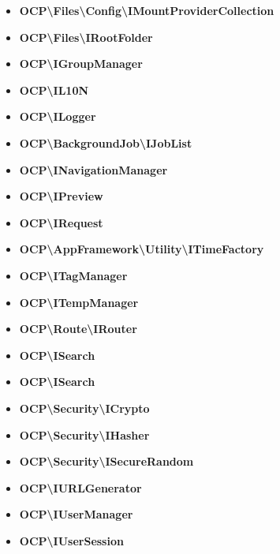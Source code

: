 \documentclass[letterpaper,10pt,english]{sphinxmanual}
\begin{document}
\begin{itemize}
\item {} 
\textbf{OCP\textbackslash{}Files\textbackslash{}Config\textbackslash{}IMountProviderCollection}

\item {} 
\textbf{OCP\textbackslash{}Files\textbackslash{}IRootFolder}

\item {} 
\textbf{OCP\textbackslash{}IGroupManager}

\item {} 
\textbf{OCP\textbackslash{}IL10N}

\item {} 
\textbf{OCP\textbackslash{}ILogger}

\item {} 
\textbf{OCP\textbackslash{}BackgroundJob\textbackslash{}IJobList}

\item {} 
\textbf{OCP\textbackslash{}INavigationManager}

\item {} 
\textbf{OCP\textbackslash{}IPreview}

\item {} 
\textbf{OCP\textbackslash{}IRequest}

\item {} 
\textbf{OCP\textbackslash{}AppFramework\textbackslash{}Utility\textbackslash{}ITimeFactory}

\item {} 
\textbf{OCP\textbackslash{}ITagManager}

\item {} 
\textbf{OCP\textbackslash{}ITempManager}

\item {} 
\textbf{OCP\textbackslash{}Route\textbackslash{}IRouter}

\item {} 
\textbf{OCP\textbackslash{}ISearch}

\item {} 
\textbf{OCP\textbackslash{}ISearch}

\item {} 
\textbf{OCP\textbackslash{}Security\textbackslash{}ICrypto}

\item {} 
\textbf{OCP\textbackslash{}Security\textbackslash{}IHasher}

\item {} 
\textbf{OCP\textbackslash{}Security\textbackslash{}ISecureRandom}

\item {} 
\textbf{OCP\textbackslash{}IURLGenerator}

\item {} 
\textbf{OCP\textbackslash{}IUserManager}

\item {} 
\textbf{OCP\textbackslash{}IUserSession}

\end{itemize}
\end{document}
